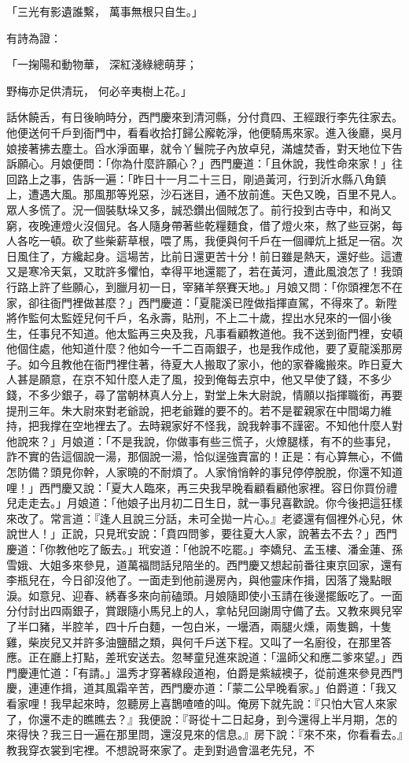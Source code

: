 「三光有影遺誰繫，  萬事無根只自生。」

有詩為證：

「一掬陽和動物華，  深紅淺綠總萌芽；

野梅亦足供清玩，  何必辛夷樹上花。」

話休饒舌，有日後晌時分，西門慶來到清河縣，分付賁四、王經跟行李先往家去。他便送何千戶到衙門中，看看收拾打歸公廨乾淨，他便騎馬來家。進入後廳，吳月娘接著拂去塵土。舀水淨面畢，就令丫鬟院子內放卓兒，滿爐焚香，對天地位下告訴願心。月娘便問：「你為什麼許願心？」西門慶道：「且休說，我性命來家！」往回路上之事，告訴一遍：「昨日十一月二十三日，剛過黃河，行到沂水縣八角鎮上，遭遇大風。那風那等兇惡，沙石迷目，通不放前進。天色又晚，百里不見人。眾人多慌了。況一個裝馱垛又多，誠恐鑽出個賊怎了。前行投到古寺中，和尚又窮，夜晚連燈火沒個兒。各人隨身帶著些乾糧麵食，借了燈火來，熬了些豆粥，每人各吃一頓。砍了些柴薪草根，喂了馬，我便與何千戶在一個禪炕上抵足一宿。次日風住了，方纔起身。這場苦，比前日還更苦十分！前日雖是熱天，還好些。這遭又是寒冷天氣，又耽許多懼怕，幸得平地還罷了，若在黃河，遭此風浪怎了！我頭行路上許了些願心，到臘月初一日，宰豬羊祭賽天地。」月娘又問：「你頭裡怎不在家，卻往衙門裡做甚麼？」西門慶道：「夏龍溪已陞做指揮直駕，不得來了。新陞將作監何太監姪兒何千戶，名永壽，貼刑，不上二十歲，捏出水兒來的一個小後生，任事兒不知道。他太監再三央及我，凡事看顧教道他。我不送到衙門裡，安頓他個住處，他知道什麼？他如今一千二百兩銀子，也是我作成他，要了夏龍溪那房子。如今且教他在衙門裡住著，待夏大人搬取了家小，他的家眷纔搬來。昨日夏大人甚是願意，在京不知什麼人走了風，投到俺每去京中，他又早使了錢，不多少錢，不多少銀子，尋了當朝林真人分上，對堂上朱大尉說，情願以指揮職銜，再要提刑三年。朱大尉來對老爺說，把老爺難的要不的。若不是翟親家在中間竭力維持，把我撑在空地裡去了。去時親家好不怪我，說我幹事不謹密。不知他什麼人對他說來？」月娘道：「不是我說，你做事有些三慌子，火燎腿樣，有不的些事兒，詐不實的告這個說一湯，那個說一湯，恰似逞強賣富的！正是：有心算無心，不備怎防備？頭見你幹，人家曉的不耐煩了。人家悄悄幹的事兒停停脫脫，你還不知道哩！」西門慶又說：「夏大人臨來，再三央我早晚看顧看顧他家裡。容日你買份禮兒走走去。」月娘道：「他娘子出月初二日生日，就一事兒喜歡說。你今後把這狂樣來改了。常言道：『逢人且說三分話，未可全拋一片心。』老婆還有個裡外心兒，休說世人！」正說，只見玳安說：「賁四問爹，要往夏大人家，說著去不去？」西門慶道：「你教他吃了飯去。」玳安道：「他說不吃罷。」李嬌兒、孟玉樓、潘金蓮、孫雪娥、大姐多來參見，道萬福問話兒陪坐的。西門慶又想起前番往東京回家，還有李瓶兒在，今日卻沒他了。一面走到他前邊房內，與他靈床作揖，因落了幾點眼淚。如意兒、迎春、綉春多來向前磕頭。月娘隨即使小玉請在後邊擺飯吃了。一面分付討出四兩銀子，賞跟隨小馬兒上的人，拿帖兒回謝周守備了去。又教來興兒宰了半口豬，半腔羊，四十斤白麵，一包白米，一壜酒，兩腿火燻，兩隻鵝，十隻雞，柴炭兒又并許多油鹽醋之類，與何千戶送下程。又叫了一名廚役，在那里答應。正在廳上打點，差玳安送去。忽琴童兒進來說道：「溫師父和應二爹來望。」西門慶連忙道：「有請。」溫秀才穿著綠段道袍，伯爵是紫絨襖子，從前進來參見西門慶，連連作揖，道其風霜辛苦，西門慶亦道：「蒙二公早晚看家。」伯爵道：「我又看家哩！我早起來時，忽聽房上喜鵲喳喳的叫。俺房下就先說：『只怕大官人來家了，你還不走的瞧瞧去？』我便說：『哥從十二日起身，到今還得上半月期，怎的來得快？我三日一遍在那里問，還沒見來的信息。』房下說：『來不來，你看看去。』教我穿衣裳到宅裡。不想說哥來家了。走到對過會溫老先兒，不